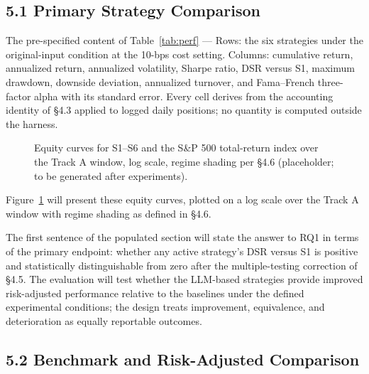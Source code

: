 \documentclass[
  12pt,
]{article}
\begin{document}
\hypertarget{primary-strategy-comparison}{%
\subsection{5.1 Primary Strategy
Comparison}\label{primary-strategy-comparison}}



\begin{table}[H]
\centering
{}
\caption{Strategy performance comparison, S1–S6, original-input condition at 10 bps (placeholder; to be populated after experiments).}
\label{tab:perf}
\end{table}

The pre-specified content of Table~\ref{tab:perf} — Rows: the six strategies under the
original-input condition at the 10-bps cost setting. Columns: cumulative
return, annualized return, annualized volatility, Sharpe ratio, DSR
versus S1, maximum drawdown, downside deviation, annualized turnover,
and Fama--French three-factor alpha with its standard error. Every cell
derives from the accounting identity of §4.3 applied to logged daily
positions; no quantity is computed outside the harness. 

\begin{figure}[H]
\centering
{}
\caption{Equity curves for S1–S6 and the S\&P 500 total-return index over the Track A window, log scale, regime shading per §4.6 (placeholder; to be generated after experiments).}
\label{fig:equity}
\end{figure}

Figure~\ref{fig:equity} will present these equity curves, plotted on a log scale over the Track A
window with regime shading as defined in §4.6.

The first sentence of the populated section will state the answer to RQ1
in terms of the primary endpoint: whether any active strategy's DSR
versus S1 is positive and statistically distinguishable from zero after
the multiple-testing correction of §4.5. The evaluation will test
whether the LLM-based strategies provide improved risk-adjusted
performance relative to the baselines under the defined experimental
conditions; the design treats improvement, equivalence, and
deterioration as equally reportable outcomes.

\hypertarget{benchmark-and-risk-adjusted-comparison}{%
\subsection{5.2 Benchmark and Risk-Adjusted
Comparison}\label{benchmark-and-risk-adjusted-comparison}}
\end{document}
